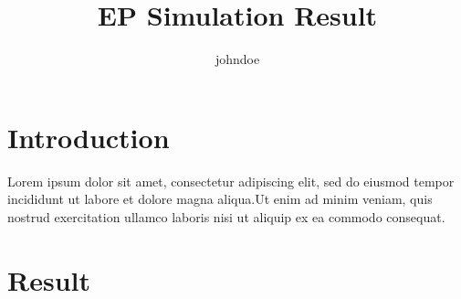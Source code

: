 \documentclass[11pt]{article}
\title{EP Simulation Result}
\author{johndoe}
\begin{document}
\maketitle
\section*{Introduction}
Lorem ipsum dolor sit amet, consectetur adipiscing elit, sed do eiusmod tempor incididunt ut labore et dolore magna aliqua.Ut enim ad minim veniam, quis nostrud exercitation ullamco laboris nisi ut aliquip ex ea commodo consequat.
\section*{Result}
\begin{center}\begin{tikzpicture}\end{tikzpicture}\end{center}
\end{document}
